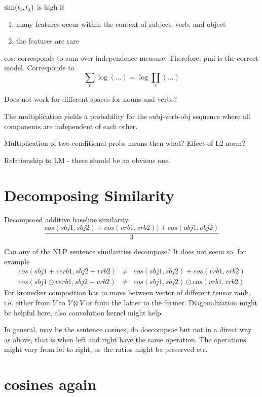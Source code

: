 $\textmd{sim}(t_i,t_j)$ is high if
\begin{enumerate}
\item many features occur within the context of subject, verb, and object
\item the features are rare
\end{enumerate}

cos: corresponds to sum over independence measure.
Therefore, pmi is the correct model.
Corresponds to
\[
\sum_c \log(...) = \log \prod_c(...)
\]



Does not work for different
spaces for nouns and verbs?

The multiplication yields a probability
for the subj-verb-obj sequence where all
components are independent of each other.

Multiplication of two conditional probs means then what?
Effect of L2 norm?


Relationship to LM - there should be an obvious one.


\section{Decomposing Similarity}
Decompsoed additive baseline similarity
\[
\frac{cos(sbj1,sbj2) + cos(vrb1,vrb2)) + cos(obj1,obj2)}{3}
\]

Can any of the NLP sentence similarities decompose? It does not seem so, for example
\begin{eqnarray*}
cos(sbj1+verb1,sbj2+vrb2) &\neq& cos(sbj1, sbj2) + cos(vrb1,vrb2) \\
cos(sbj1\odot verb1,sbj2+vrb2) &\neq& cos(sbj1, sbj2) \odot cos(vrb1,vrb2)
\end{eqnarray*}
For kronecker composition has to move between vector of different tensor rank, i.e. either from $V$ to $V \otimes V$ or from the latter to the former. Diagonalization might be helpful here, also convolution kernel might help. 

In general, may be the sentence cosines, do doecompsoe but not in a direct way as above, that is when left and right have the same operation. The operations might vary from lef to right, or the ratios might be preserved etc. 



\section{cosines again}

